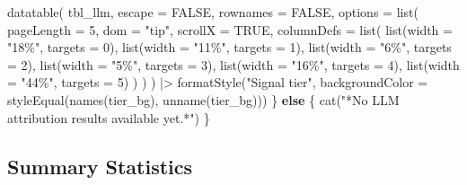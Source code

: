 \documentclass[
  11pt,
  letterpaper,
]{article}
\newenvironment{Shaded}{\begin{snugshade}}{\end{snugshade}}
\newcommand{\AttributeTok}[1]{\textcolor[rgb]{0.40,0.45,0.13}{#1}}
\newcommand{\ConstantTok}[1]{\textcolor[rgb]{0.56,0.35,0.01}{#1}}
\newcommand{\ControlFlowTok}[1]{\textcolor[rgb]{0.00,0.23,0.31}{\textbf{#1}}}
\newcommand{\DecValTok}[1]{\textcolor[rgb]{0.68,0.00,0.00}{#1}}
\newcommand{\FunctionTok}[1]{\textcolor[rgb]{0.28,0.35,0.67}{#1}}
\newcommand{\NormalTok}[1]{\textcolor[rgb]{0.00,0.23,0.31}{#1}}
\newcommand{\SpecialCharTok}[1]{\textcolor[rgb]{0.37,0.37,0.37}{#1}}
\newcommand{\StringTok}[1]{\textcolor[rgb]{0.13,0.47,0.30}{#1}}
\begin{document}
\begin{table}
\begin{Shaded}
\begin{Highlighting}[]
  \FunctionTok{datatable}\NormalTok{(}
\NormalTok{    tbl\_llm,}
    \AttributeTok{escape   =} \ConstantTok{FALSE}\NormalTok{,}
    \AttributeTok{rownames =} \ConstantTok{FALSE}\NormalTok{,}
    \AttributeTok{options  =} \FunctionTok{list}\NormalTok{(}
      \AttributeTok{pageLength =} \DecValTok{5}\NormalTok{,}
      \AttributeTok{dom        =} \StringTok{"tip"}\NormalTok{,}
      \AttributeTok{scrollX    =} \ConstantTok{TRUE}\NormalTok{,}
      \AttributeTok{columnDefs =} \FunctionTok{list}\NormalTok{(}
        \FunctionTok{list}\NormalTok{(}\AttributeTok{width =} \StringTok{"18\%"}\NormalTok{, }\AttributeTok{targets =} \DecValTok{0}\NormalTok{),}
        \FunctionTok{list}\NormalTok{(}\AttributeTok{width =} \StringTok{"11\%"}\NormalTok{, }\AttributeTok{targets =} \DecValTok{1}\NormalTok{),}
        \FunctionTok{list}\NormalTok{(}\AttributeTok{width =} \StringTok{"6\%"}\NormalTok{,  }\AttributeTok{targets =} \DecValTok{2}\NormalTok{),}
        \FunctionTok{list}\NormalTok{(}\AttributeTok{width =} \StringTok{"5\%"}\NormalTok{,  }\AttributeTok{targets =} \DecValTok{3}\NormalTok{),}
        \FunctionTok{list}\NormalTok{(}\AttributeTok{width =} \StringTok{"16\%"}\NormalTok{, }\AttributeTok{targets =} \DecValTok{4}\NormalTok{),}
        \FunctionTok{list}\NormalTok{(}\AttributeTok{width =} \StringTok{"44\%"}\NormalTok{, }\AttributeTok{targets =} \DecValTok{5}\NormalTok{)}
\NormalTok{      )}
\NormalTok{    )}
\NormalTok{  ) }\SpecialCharTok{|\textgreater{}}
  \FunctionTok{formatStyle}\NormalTok{(}\StringTok{"Signal tier"}\NormalTok{,}
    \AttributeTok{backgroundColor =} \FunctionTok{styleEqual}\NormalTok{(}\FunctionTok{names}\NormalTok{(tier\_bg), }\FunctionTok{unname}\NormalTok{(tier\_bg)))}
\NormalTok{\} }\ControlFlowTok{else}\NormalTok{ \{}
  \FunctionTok{cat}\NormalTok{(}\StringTok{"*No LLM attribution results available yet.*"}\NormalTok{)}
\NormalTok{\}}
\end{Highlighting}
\end{Shaded}

\end{table}%

\subsection{Summary Statistics}\label{summary-statistics}
\end{document}
